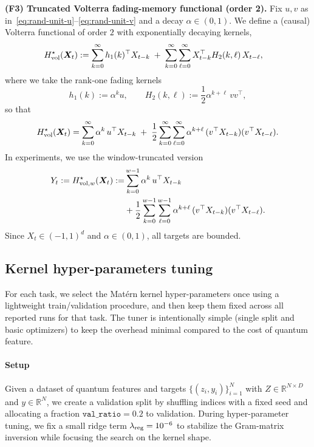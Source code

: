 \noindent\textbf{(F3) Truncated Volterra fading-memory functional (order 2).}
Fix $u,v$ as in~\cref{eq:rand-unit-u}--\cref{eq:rand-unit-v} and a decay $\alpha\in(0,1)$.
We define a (causal) Volterra functional of order $2$ with exponentially decaying kernels,
\begin{align}
    H^\star_{\rm vol}(\boldsymbol{X}_t)
    &:= \sum_{k=0}^{\infty} h_1(k)^\top X_{t-k}
      \;+\; \sum_{k=0}^{\infty}\sum_{\ell=0}^{\infty} X_{t-k}^\top H_2(k,\ell)\, X_{t-\ell},
      \label{eq:volterra-general}
\end{align}
where we take the rank-one fading kernels
\begin{equation}\label{eq:volterra-kernels}
    h_1(k) := \alpha^k u,
    \qquad
    H_2(k,\ell) := \frac{1}{2}\alpha^{k+\ell}\, v v^\top,
\end{equation}
so that
\begin{equation}\label{eq:volterra-expanded}
    H^\star_{\rm vol}(\boldsymbol{X}_t)
    = \sum_{k=0}^{\infty}\alpha^k\, u^\top X_{t-k}
    \;+\; \frac{1}{2}\sum_{k=0}^{\infty}\sum_{\ell=0}^{\infty}\alpha^{k+\ell}\,
    (v^\top X_{t-k})(v^\top X_{t-\ell}).
\end{equation}
In experiments, we use the window-truncated version
\begin{equation}\label{eq:F3}
\begin{aligned}
    Y_t := H^\star_{{\rm vol},w}(\boldsymbol{X}_t)
    := &\sum_{k=0}^{w-1}\alpha^k\, u^\top X_{t-k}\\
    &+ \frac{1}{2}\sum_{k=0}^{w-1}\sum_{\ell=0}^{w-1}\alpha^{k+\ell}\,
    (v^\top X_{t-k})(v^\top X_{t-\ell}).
\end{aligned}
\end{equation}
Since $X_t\in(-1,1)^d$ and $\alpha\in(0,1)$, all targets are bounded.


\subsection{Kernel hyper-parameters tuning}\label{app:kernel-tuning}

For each task, we select the Matérn kernel hyper-parameters once using a lightweight
train/validation procedure, and then keep them fixed across all reported runs for that task. The tuner is intentionally simple (single split and basic optimizers) to keep the overhead minimal compared to the cost of quantum feature.

\paragraph{Setup}
Given a dataset of quantum features and targets $\{(z_i,y_i)\}_{i=1}^N$ with
$Z \in \mathbb{R}^{N\times D}$ and $y\in\mathbb{R}^N$, we create a validation split by shuffling indices
with a fixed seed and allocating a fraction $\texttt{val\_ratio}=0.2$ to validation.
During hyper-parameter tuning, we fix a small ridge term $\lambda_{\rm reg}=10^{-6}$ to stabilize
the Gram-matrix inversion while focusing the search on the kernel shape.

